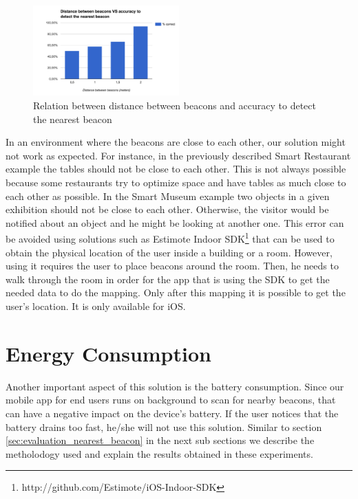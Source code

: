 \begin{figure}[!ht]
  \centering
    \includegraphics[width=0.5\textwidth, keepaspectratio]{images/results_nearest_beacon}
    \caption[Distance between beacons vs Accuracy]{Relation between distance between beacons and accuracy to detect the nearest beacon}
    \label{fig:results_experiments_nearest_beacon}
\end{figure}

In an environment where the beacons are close to each other, our solution might not work as expected.
For instance, in the previously described Smart Restaurant example
the tables should not be close to each other. This is not always possible because some restaurants try to optimize space and have tables as much close to each other as possible.
In the Smart Museum example two objects in a given exhibition should not be close to each other.
Otherwise, the visitor would be notified about an object and he might be looking at another one.
This error can be avoided using solutions such as Estimote Indoor \gls{SDK}\footnote{http://github.com/Estimote/iOS-Indoor-SDK} that can be used to obtain the physical location of the user inside a building or a room.
However, using it requires the user to place beacons around the room.
Then, he needs to walk through the room in order for the app that is using the \gls{SDK} to get the needed data to do the mapping.
Only after this mapping it is possible to get the user's location.
It is only available for iOS.

\section{Energy Consumption}
\label{sec:evaluation_energy_consumption}
Another important aspect of this solution is the battery consumption.
Since our mobile app for end users runs on background to scan for nearby beacons, that can have a negative impact on the device's battery. If the user notices that the battery drains too fast, he/she will not use this solution.
Similar to section \ref{sec:evaluation_nearest_beacon} in the next sub sections we describe the metholodogy used and explain the results obtained in these experiments.

